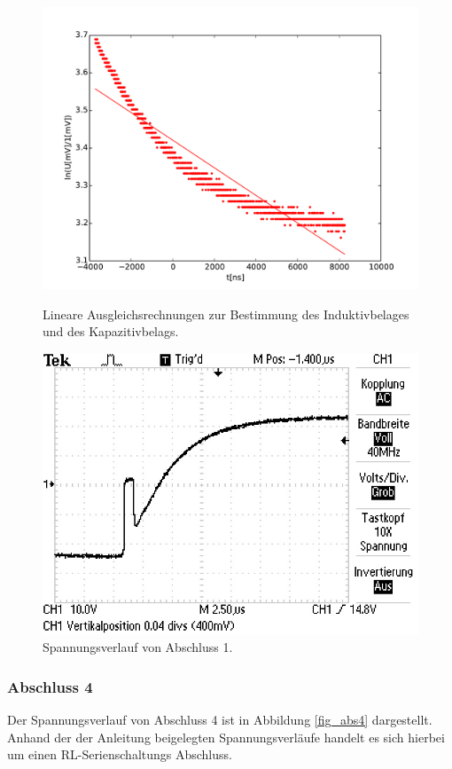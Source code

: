 \begin{figure}
	\centering
	\includegraphics[width = 14cm]{data/d/Regression1.pdf}
	\caption{Lineare Ausgleichsrechnungen zur Bestimmung des Induktivbelages und des Kapazitivbelags.}
	\includegraphics[width = 12cm]{data/d/F0004TEK.JPG}
	\caption{Spannungsverlauf von Abschluss 1.}
	\label{fig_abs1}
\end{figure}
\FloatBarrier
\subsubsection{Abschluss 4} %
\label{sub:abschluss_4}

Der Spannungsverlauf von Abschluss 4 ist in Abbildung \ref{fig_abs4} dargestellt.
Anhand der der Anleitung beigelegten Spannungsverläufe handelt es sich hierbei um einen RL-Serienschaltungs Abschluss.

